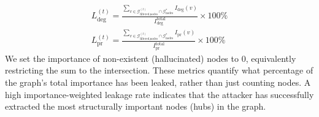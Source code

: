 \begin{align}
L_{\text{deg}}^{(t)} = \frac{\sum_{v \in \mathcal{G}_{\text{filtered,nodes}}^{(t)} \cap \mathcal{G}^*_{\text{nodes}}} I_{\text{deg}}(v)}{I_{\text{deg}}^{\text{total}}} \times 100\%  \label{eq:degree}\\
L_{\text{pr}}^{(t)} = \frac{\sum_{v \in \mathcal{G}_{\text{filtered,nodes}}^{(t)} \cap \mathcal{G}^*_{\text{nodes}}} I_{\text{pr}}(v)}{I_{\text{pr}}^{\text{total}}} \times 100\% \label{eq:pagerank}
\end{align}
We set the importance of non-existent (hallucinated) nodes to 0, equivalently restricting the sum to the intersection. These metrics quantify what percentage of the graph's total importance has been leaked, rather than just counting nodes. A high importance-weighted leakage rate indicates that the attacker has successfully extracted the most structurally important nodes (hubs) in the graph.





